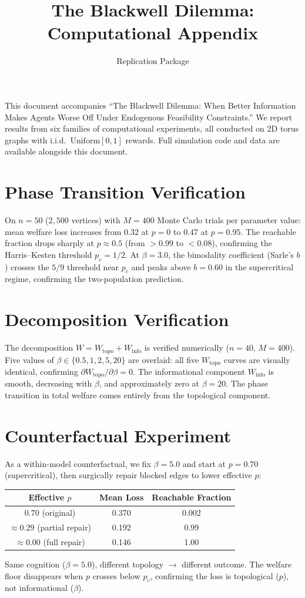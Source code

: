\documentclass[12pt]{article}
\title{The Blackwell Dilemma: Computational Appendix}
\author{Replication Package}
\date{}
\newcommand{\Wtopo}{W_{\mathrm{topo}}}
\newcommand{\Winfo}{W_{\mathrm{info}}}
\begin{document}
\maketitle

This document accompanies ``The Blackwell Dilemma: When Better Information Makes Agents Worse Off Under Endogenous Feasibility Constraints.'' We report results from six families of computational experiments, all conducted on 2D torus graphs with i.i.d.\ $\mathrm{Uniform}[0,1]$ rewards. Full simulation code and data are available alongside this document.

\section{Phase Transition Verification}

On $n = 50$ ($2{,}500$ vertices) with $M = 400$ Monte Carlo trials per parameter value: mean welfare loss increases from 0.32 at $p = 0$ to 0.47 at $p = 0.95$. The reachable fraction drops sharply at $p \approx 0.5$ (from $>0.99$ to $<0.08$), confirming the Harris--Kesten threshold $p_c = 1/2$. At $\beta = 3.0$, the bimodality coefficient (Sarle's $b$) crosses the $5/9$ threshold near $p_c$ and peaks above $b = 0.60$ in the supercritical regime, confirming the two-population prediction.

\section{Decomposition Verification}

The decomposition $W = \Wtopo + \Winfo$ is verified numerically ($n = 40$, $M = 400$). Five values of $\beta \in \{0.5, 1, 2, 5, 20\}$ are overlaid: all five $\Wtopo$ curves are visually identical, confirming $\partial \Wtopo / \partial \beta = 0$. The informational component $\Winfo$ is smooth, decreasing with $\beta$, and approximately zero at $\beta = 20$. The phase transition in total welfare comes entirely from the topological component.

\section{Counterfactual Experiment}

As a within-model counterfactual, we fix $\beta = 5.0$ and start at $p = 0.70$ (supercritical), then surgically repair blocked edges to lower effective $p$:
\begin{center}
\begin{tabular}{ccc}
\toprule
Effective $p$ & Mean Loss & Reachable Fraction \\
\midrule
0.70 (original) & 0.370 & 0.002 \\
$\approx 0.29$ (partial repair) & 0.192 & 0.99 \\
$\approx 0.00$ (full repair) & 0.146 & 1.00 \\
\bottomrule
\end{tabular}
\end{center}
Same cognition ($\beta = 5.0$), different topology $\to$ different outcome. The welfare floor disappears when $p$ crosses below $p_c$, confirming the loss is topological ($p$), not informational ($\beta$).
\end{document}
